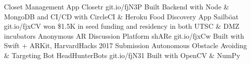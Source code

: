 \begin{cvhonors}
  \cvhonor
    {Closet Management App}
    {Closetr}
    {}
    {git.io/fjN3P}
    {Built Backend with Node \& MongoDB and CI/CD with CircleCI \& Heroku}
  \cvhonor
    {Food Discovery App}
    {Sailböat}
    {}
    {git.io/fjxCV}
    {won \$1.5K in seed funding and residency in both UTSC \& DMZ incubators}
  \cvhonor
    {Anonymous AR Discussion Platform}
    {shARe}
    {}
    {git.io/fjxCw}
    {Built with Swift + ARKit, HarvardHacks 2017 Submission}
  \cvhonor
    {Autonomous Obstacle Avoiding \& Targeting Bot}
    {HeadHunterBots}
    {}
    {git.io/fjN31}
    {Built with OpenCV \& NumPy}
\end{cvhonors}

